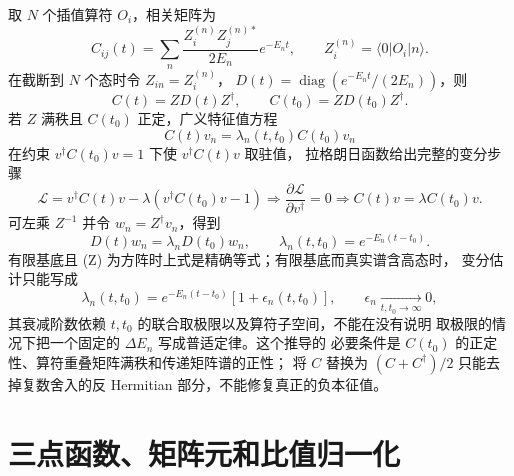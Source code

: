 \documentclass[UTF8,11pt,oneside]{ctexbook}
\begin{document}
取 \(N\) 个插值算符 \(O_i\)，相关矩阵为
\begin{equation}
 C_{ij}(t)=\sum_n\frac{Z_i^{(n)}Z_j^{(n)*}}{2E_n}e^{-E_nt},
 \qquad Z_i^{(n)}=\langle0|O_i|n\rangle .
 \label{eq:deep-correlation-matrix}
\end{equation}
在截断到 \(N\) 个态时令 \(Z_{in}=Z_i^{(n)}\)，
\(D(t)=\operatorname{diag}(e^{-E_nt}/(2E_n))\)，则
\begin{equation}
 C(t)=Z D(t)Z^\dagger,\qquad C(t_0)=ZD(t_0)Z^\dagger .
 \label{eq:deep-correlation-factorization}
\end{equation}
若 \(Z\) 满秩且 \(C(t_0)\) 正定，广义特征值方程
\begin{equation}
 C(t)v_n=\lambda_n(t,t_0)C(t_0)v_n
 \label{eq:deep-gevp}
\end{equation}
在约束 \(v^\dagger C(t_0)v=1\) 下使 \(v^\dagger C(t)v\) 取驻值，
拉格朗日函数给出完整的变分步骤
\begin{equation}
 \mathcal L=v^\dagger C(t)v-\lambda(v^\dagger C(t_0)v-1)
 \Longrightarrow\frac{\partial\mathcal L}{\partial v^\dagger}=0
 \Longrightarrow C(t)v=\lambda C(t_0)v .
 \label{eq:deep-gevp-variation}
\end{equation}
可左乘 \(Z^{-1}\) 并令 \(w_n=Z^\dagger v_n\)，得到
\begin{equation}
 D(t)w_n=\lambda_nD(t_0)w_n,\qquad
 \lambda_n(t,t_0)=e^{-E_n(t-t_0)} .
 \label{eq:deep-gevp-diagonal}
\end{equation}
有限基底且 (Z) 为方阵时上式是精确等式；有限基底而真实谱含高态时，
变分估计只能写成
\begin{equation}
 \lambda_n(t,t_0)=e^{-E_n(t-t_0)}
 \left[1+\epsilon_n(t,t_0)\right],
 \qquad \epsilon_n\xrightarrow[t,t_0\to\infty]{}0,
 \label{eq:deep-gevp-correction}
\end{equation}
其衰减阶数依赖 \(t,t_0\) 的联合取极限以及算符子空间，不能在没有说明
取极限的情况下把一个固定的 \(\Delta E_n\) 写成普适定律。这个推导的
必要条件是 \(C(t_0)\) 的正定性、算符重叠矩阵满秩和传递矩阵谱的正性；
将 \(C\) 替换为 \((C+C^\dagger)/2\) 只能去掉复数舍入的反 Hermitian
部分，不能修复真正的负本征值。

\section{三点函数、矩阵元和比值归一化}
\end{document}
